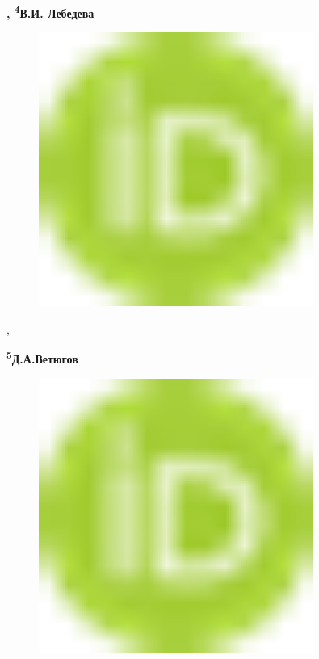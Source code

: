 {\bfseries ,
\textsuperscript{4}В.И.
Лебедева}
\begin{figure}[H]
	\centering
	\includegraphics[width=0.8\textwidth]{media/chem2/image1}
	\caption*{}
\end{figure}
,

{\bfseries \textsuperscript{5}Д.А.Ветюгов}
\begin{figure}[H]
	\centering
	\includegraphics[width=0.8\textwidth]{media/chem2/image1}
	\caption*{}
\end{figure}

